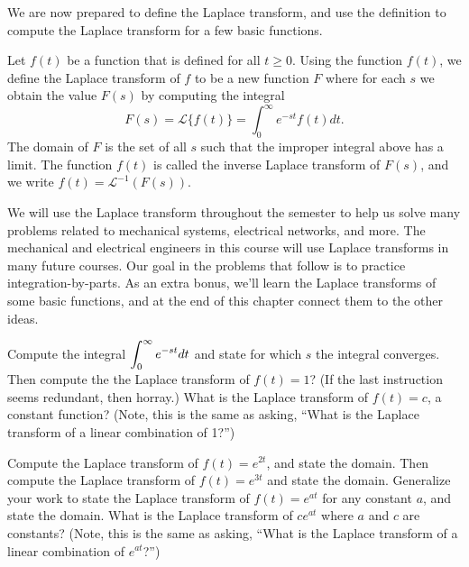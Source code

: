 We are now prepared to define the Laplace transform, and use the definition to compute the Laplace transform for a few basic functions.


\begin{definition}
Let $f(t)$ be a function that is defined for all $t\geq 0$.  
Using the function $f(t)$, we define the Laplace transform of $f$ to be a new function $F$ where for each $s$ we obtain the value $F(s)$ by computing the integral
$$F(s) = \mathscr{L}\{f(t)\}=\int_0^\infty e^{-st}f(t)dt.$$
The domain of $F$ is the set of all $s$ such that the improper integral above has a limit. 
The function $f(t)$ is called the inverse Laplace transform of $F(s)$, and we write $f(t)=\mathscr{L}^{-1}(F(s))$.
\end{definition}

We will use the Laplace transform throughout the semester to help us solve many problems related to mechanical systems, electrical networks, and more. The mechanical and electrical engineers in this course will use Laplace transforms in many future courses. Our goal in the problems that follow is to practice integration-by-parts.  As an extra bonus, we'll learn the Laplace transforms of some basic functions, and at the end of this chapter connect them to the other ideas.


\begin{problem}
Compute the integral $\displaystyle\int_0^\infty e^{-st}dt$ and state for which $s$ the integral converges. 
Then compute the the Laplace transform of $f(t)=1$? (If the last instruction seems redundant, then horray.) What is the Laplace transform of $f(t) = c$, a constant function? (Note, this is the same as asking, ``What is the Laplace transform of a linear combination of 1?'')
\end{problem}


\begin{problem}
Compute the Laplace transform of $f(t)=e^{2t}$, and state the domain.  
Then compute the Laplace transform of $f(t)=e^{3t}$ and state the domain.
Generalize your work to state the Laplace transform of $f(t)=e^{at}$ for any constant $a$, and state the domain.  
What is the Laplace transform of $ce^{at}$ where $a$ and $c$ are constants?
(Note, this is the same as asking, ``What is the Laplace transform of a linear combination of $e^{at}$?'')
\end{problem}


